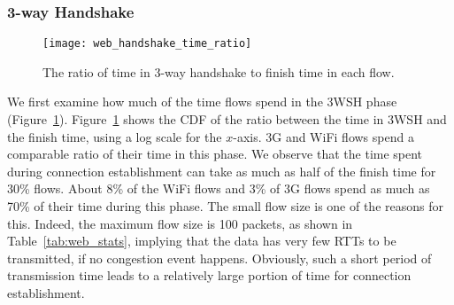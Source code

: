 
\subsubsection{3-way Handshake}

\begin{figure}[th]
\centering
\texttt{[image: web\_handshake\_time\_ratio]}
\caption{The ratio of time in 3-way handshake to finish time in each flow.}
\label{fig:web_handshake_ratio}
\end{figure}

We first examine how much of the time flows spend in the 3WSH phase (Figure~\ref{fig:web_handshake_ratio}). Figure~\ref{fig:web_handshake_ratio} shows the CDF of the ratio between the time in 3WSH and the finish time, using a log scale for the $x$-axis. 3G and WiFi flows spend a comparable ratio of their time in this phase. We observe that the time spent during connection establishment can take as much as half of the finish time for 30\% flows. About 8\% of the WiFi flows and 3\% of 3G flows spend as much as 70\% of their time during this phase. The small flow size is one of the reasons for this. Indeed, the maximum flow size is 100 packets, as shown in Table~\ref{tab:web_stats}, implying that the data has very few RTTs to be transmitted, if no congestion event happens. Obviously, such a short period of transmission time leads to a relatively large portion of time for connection establishment.




